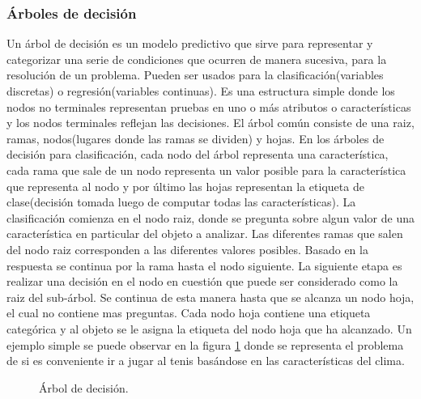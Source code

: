 \subsubsection{Árboles de decisión}

	Un árbol de decisión es un modelo predictivo que sirve para representar y categorizar una serie de condiciones que ocurren de manera sucesiva, para la resolución de un problema. Pueden ser usados para la clasificación(variables discretas) o regresión(variables continuas). Es una estructura simple donde los nodos no terminales representan pruebas en uno o más atributos o características y los nodos terminales reflejan las decisiones. El árbol común consiste de una raiz, ramas, nodos(lugares donde las ramas se dividen) y hojas. En los árboles de decisión para clasificación, cada nodo del árbol representa una característica, cada rama que sale de un nodo representa un valor posible para la característica que representa al nodo y por último las hojas representan la etiqueta de clase(decisión tomada luego de computar todas las características). La clasificación comienza en el nodo raiz, donde se pregunta sobre algun valor de una característica en particular del objeto a analizar. Las diferentes ramas que salen del nodo raiz corresponden a las diferentes valores posibles. Basado en la respuesta se continua por la rama hasta el nodo siguiente. La siguiente etapa es realizar una decisión en el nodo en cuestión que puede ser considerado como la raiz del sub-árbol. Se continua de esta manera hasta que se alcanza un nodo hoja, el cual no contiene mas preguntas. Cada nodo hoja contiene una etiqueta categórica y al objeto se le asigna la etiqueta del nodo hoja que ha alcanzado. Un ejemplo simple se puede observar en la figura \ref{fig: Arbol de decision} donde se representa el problema de si es conveniente ir a jugar al tenis basándose en las características del clima.
		\begin{figure}[htbp]
			\centering
			\caption{Árbol de decisión.}
			\label{fig: Arbol de decision}
		\end{figure} 
	